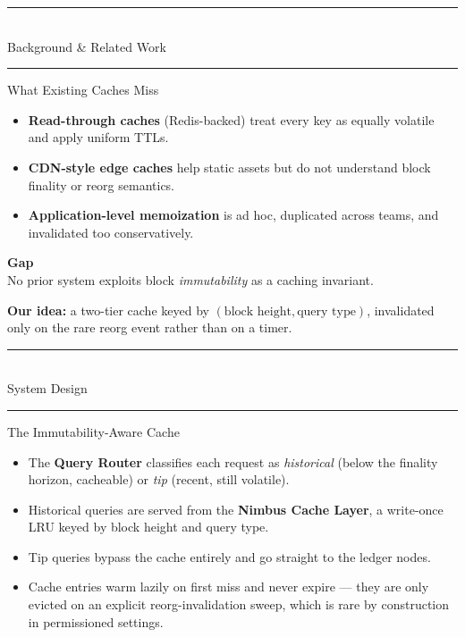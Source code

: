 \documentclass[pdf]{prosper}
\newcommand{\Divider}[1]{%
\begin{slide}{}
\vspace{2.2cm}
\begin{center}
{\color{softgray}\rule{6cm}{0.4pt}}\\[0.5cm]
{\usefont{T1}{phv}{b}{n}\selectfont\color{deepnavy}\Huge #1}\\[0.4cm]
{\color{softgray}\rule{6cm}{0.4pt}}
\end{center}
\end{slide}%
}
\begin{document}
\Divider{Background \& Related Work}

\begin{slide}{What Existing Caches Miss}
\begin{minipage}[t]{0.56\linewidth}
\begin{itemize}
\item \textbf{Read-through caches} (Redis-backed) treat every key as equally volatile and apply uniform TTLs.
\item \textbf{CDN-style edge caches} help static assets but do not understand block finality or reorg semantics.
\item \textbf{Application-level memoization} is ad hoc, duplicated across teams, and invalidated too conservatively.
\end{itemize}
\end{minipage}%
\hfill
\begin{minipage}[t]{0.38\linewidth}
\begin{tcolorbox}[colback=deepnavy,colframe=deepnavy,coltext=paperwhite,arc=2pt,left=6pt,right=6pt,top=6pt,bottom=6pt]
\textbf{Gap}\\[2pt]
\small No prior system exploits block \emph{immutability} as a caching invariant.
\end{tcolorbox}
\end{minipage}
\par
\vspace{0.6cm}
\textbf{Our idea:} a two-tier cache keyed by \((\text{block height}, \text{query type})\), invalidated only on the rare reorg event rather than on a timer.
\end{slide}

\Divider{System Design}

\begin{slide}{The Immutability-Aware Cache}
\begin{itemize}
\item The \textbf{Query Router} classifies each request as \emph{historical} (below the finality horizon, cacheable) or \emph{tip} (recent, still volatile).
\item Historical queries are served from the \textbf{Nimbus Cache Layer}, a write-once LRU keyed by block height and query type.
\item Tip queries bypass the cache entirely and go straight to the ledger nodes.
\item Cache entries warm lazily on first miss and never expire --- they are only evicted on an explicit reorg-invalidation sweep, which is rare by construction in permissioned settings.
\end{itemize}
\end{slide}
\end{document}
